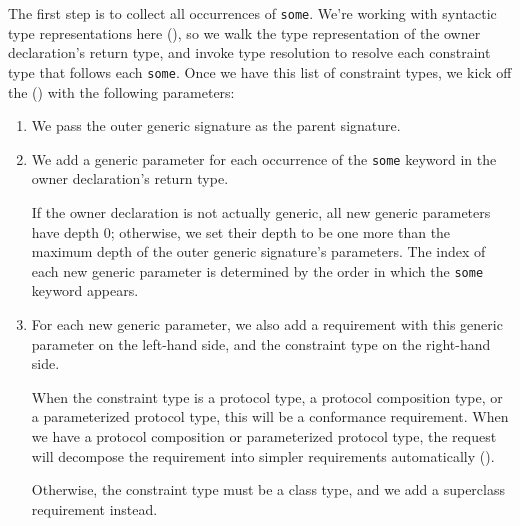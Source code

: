 \documentclass[../generics]{subfiles}
\begin{document}
The first step is to collect all occurrences of \texttt{some}. We're working with syntactic type representations here (), so we walk the type representation of the owner declaration's return type, and invoke type resolution to resolve each constraint type that follows each \texttt{some}. Once we have this list of constraint types, we kick off the  () with the following parameters:
\begin{enumerate}
\item We pass the outer generic signature as the parent signature.
\item We add a generic parameter for each occurrence of the \texttt{some} keyword in the owner declaration's return type.

If the owner declaration is not actually generic, all new generic parameters have depth 0; otherwise, we set their depth to be one more than the maximum depth of the outer generic signature's parameters. The index of each new generic parameter is determined by the order in which the \texttt{some} keyword appears.

\item For each new generic parameter, we also add a requirement with this generic parameter on the left-hand side, and the constraint type on the right-hand side.

When the constraint type is a protocol type, a protocol composition type, or a parameterized protocol type, this will be a conformance requirement. When we have a protocol composition or parameterized protocol type, the request will decompose the requirement into simpler requirements automatically ().

Otherwise, the constraint type must be a class type, and we add a superclass requirement instead.

\end{enumerate}
\end{document}
